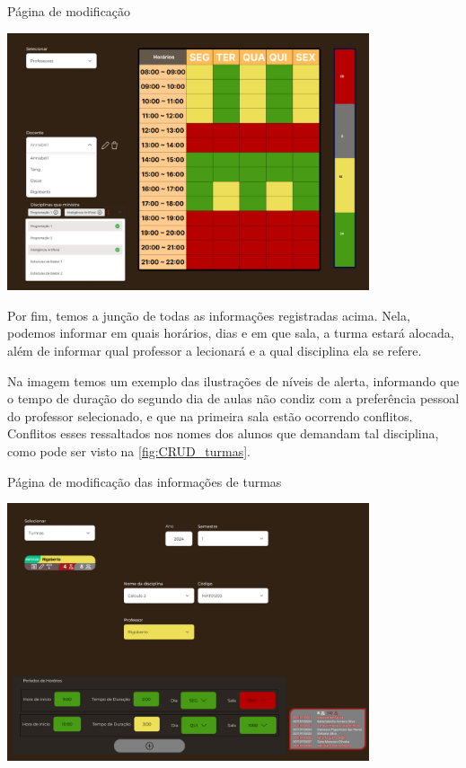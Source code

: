 \begin{MyCenteredFigure}
  \caption{Página de modificação}
  \label{fig:CRUD_professores}
  \includegraphics[width=0.8\textwidth]{files/img/Prototipo/Medio/CRUD_professores}
\end{MyCenteredFigure} %

Por fim, temos a junção de todas as informações registradas acima. Nela, podemos informar em quais horários, dias e em que sala, a turma estará alocada, além de informar qual professor a lecionará e a qual disciplina ela se refere.

Na imagem temos um exemplo das ilustrações de níveis de alerta, informando que o tempo de duração do segundo dia de aulas não condiz com a preferência pessoal do professor selecionado, e que na primeira sala estão ocorrendo conflitos. Conflitos esses ressaltados nos nomes dos alunos que demandam tal disciplina, como pode ser visto na \autoref{fig:CRUD_turmas}.

\begin{MyCenteredFigure}
  \caption{Página de modificação das informações de turmas}
  \label{fig:CRUD_turmas}
  \includegraphics[width=0.8\textwidth]{files/img/Prototipo/Medio/CRUD_turmas}
\end{MyCenteredFigure} %
